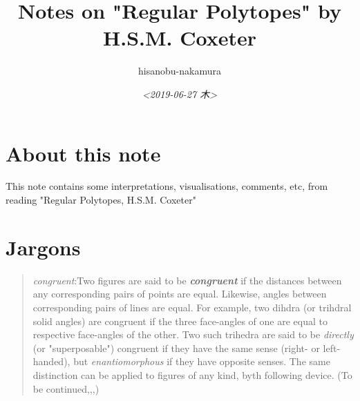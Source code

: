 \documentclass{article}
\author{hisanobu-nakamura}
\date{\textit{<2019-06-27 木>}}
\title{Notes on "Regular Polytopes" by H.S.M. Coxeter}
\begin{document}
\maketitle
\tableofcontents




\section{About this note}
\label{sec-1}
This note contains some interpretations, visualisations, comments, etc, from reading "Regular Polytopes, H.S.M. Coxeter"
\section{Jargons}
\label{sec-2}
\begin{quote}
\emph{congruent}:Two figures are said to be \textbf{\emph{congruent}} if the distances between any corresponding pairs of points are equal. Likewise, angles between corresponding pairs of lines are equal. 
For example, two dihdra (or trihdral solid angles) are congruent if the three face-angles of one are equal to respective face-angles of the other. 
Two such trihedra are said to be \emph{directly} (or "superposable") congruent if they have the same sense (right- or left-handed), but \emph{enantiomorphous} if they have opposite senses. 
The same distinction can be applied to figures of any kind, byth following device. (To be continued,,,)
\end{quote}
\end{document}

